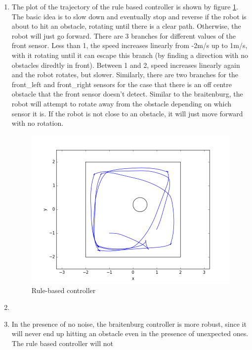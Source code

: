 \documentclass[12pt,a4paper]{article}
\begin{document}
\begin{enumerate}[label=(\alph*)]
		\item The plot of the trajectory of the rule based controller is shown by figure \ref{fig:rule-based}. The basic idea is to slow down and eventually stop and reverse if the robot is about to hit an obstacle, rotating until there is a clear path. Otherwise, the robot will just go forward. There are 3 branches for different values of the front sensor. Less than 1, the speed increases linearly from -2m/s up to 1m/s, with it rotating until it can escape this branch (by finding a direction with no obstacles diredtly in front). Between 1 and 2, speed increases linearly again and the robot rotates, but slower.  Similarly, there are two branches for the front\_left and front\_right sensors for the case that there is an off centre obstacle that the front sensor doesn't detect. Similar to the braitenburg, the robot will attempt to rotate away from the obstacle depending on which sensor it is. If the robot is not close to an obstacle, it will just move forward with no rotation.
		\begin{figure}[h]
			\centering
			\includegraphics[width=\textwidth]{fig/2b.png}
			\caption{Rule-based controller}
			\label{fig:rule-based}
		\end{figure}

		\item 

        \item In the presence of no noise, the braitenburg controller is more robust, since it will never end up hitting an obstacle even in the presence of unexpected ones. The rule based controller will not 
\end{enumerate}
\end{document}

